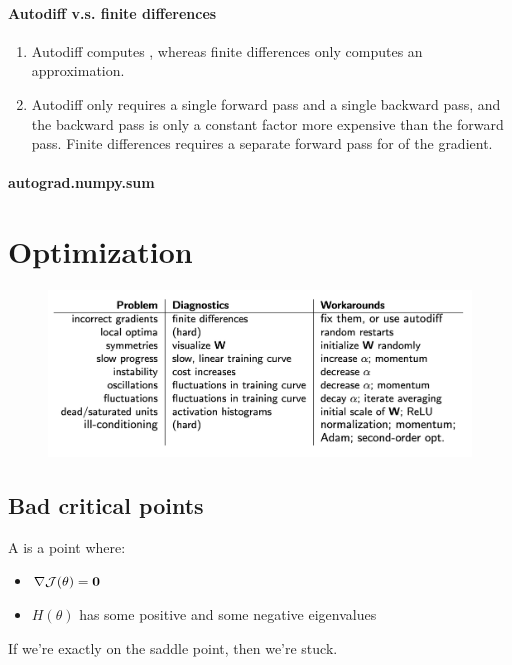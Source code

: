 \documentclass[11pt]{article}
\begin{document}
\paragraph{Autodiff v.s. finite differences}
\begin{enumerate}
	\item Autodiff computes , whereas finite differences only computes an approximation.
	\item Autodiff only requires a single forward pass and a single backward pass, and the backward pass is only a constant factor more expensive than the forward pass. Finite differences requires a separate forward pass for  of the gradient.
\end{enumerate}

\paragraph{autograd.numpy.sum}



\section{Optimization}
	\begin{figure}[H]
		\centering
		\includegraphics[scale=0.6]{p2.png}
	\end{figure}

\subsection{Bad critical points}
A  is a point where:
\begin{itemize}
	\item $\nabla \mathcal{J}(\theta) = \textbf{0}$
	\item $H(\theta)$ has some positive and some negative eigenvalues
\end{itemize}
\remark
If we're exactly on the saddle point, then we're stuck.
\end{document}
